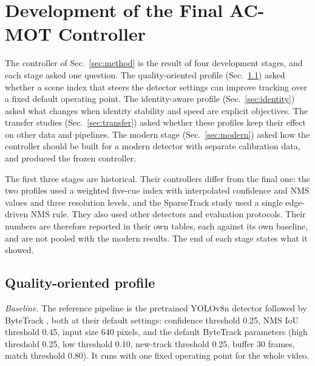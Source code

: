 \documentclass[journal]{new-aiaa}
\begin{document}
\section{Development of the Final AC-MOT Controller}\label{sec:development}

The controller of Sec.~\ref{sec:method} is the result of four development
stages, and each stage asked one question. The quality-oriented profile
(Sec.~\ref{sec:quality}) asked whether a scene index that steers the detector
settings can improve tracking over a fixed default operating point. The
identity-aware profile (Sec.~\ref{sec:identity}) asked what changes when
identity stability and speed are explicit objectives. The transfer studies
(Sec.~\ref{sec:transfer}) asked whether these profiles keep their effect on
other data and pipelines. The modern stage (Sec.~\ref{sec:modern}) asked how
the controller should be built for a modern detector with separate
calibration data, and produced the frozen controller.

The first three stages are historical. Their controllers differ from the
final one: the two profiles used a weighted five-cue index with interpolated
confidence and NMS values and three resolution levels, and the SparseTrack
study used a single edge-driven NMS rule. They also used other detectors and
evaluation protocols. Their numbers are therefore reported in their own
tables, each against its own baseline, and are not pooled with the modern
results. The end of each stage states what it showed.

\subsection{Quality-oriented profile}\label{sec:quality}

\emph{Baseline.} The reference pipeline is the pretrained YOLOv8n detector
\cite{jocher2023yolov8} followed by ByteTrack \cite{zhang2022bytetrack}, both at
their default settings: confidence threshold 0.25, NMS IoU threshold 0.45,
input size 640 pixels, and the default ByteTrack parameters (high threshold
0.25, low threshold 0.10, new-track threshold 0.25, buffer 30 frames, match
threshold 0.80). It runs with one fixed operating point for the whole video.
\end{document}
